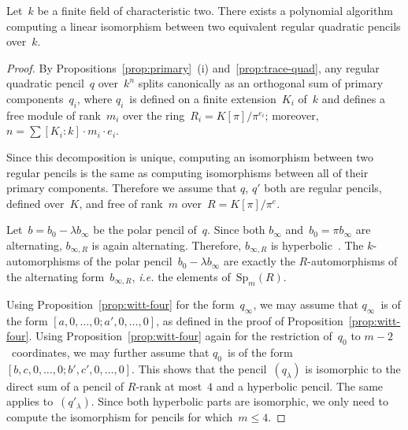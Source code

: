 \documentclass{amsart}
\begin{document}
\begin{prop}\label{prop:ip1s-bin-polynomial}
Let~$k$ be a finite field of characteristic two.
There exists a polynomial algorithm computing a linear isomorphism between
two equivalent regular quadratic pencils over~$k$.
\end{prop}
\begin{proof}
By Propositions~\ref{prop:primary}~(i) and~\ref{prop:trace-quad},
any regular quadratic pencil~$q$ over~$k^n$
splits canonically as an orthogonal sum of primary components~$q_i$,
where $q_i$~is defined on a finite extension~$K_i$ of~$k$
and defines a free module of rank~$m_i$ over the ring~$R_i = K[π]/π^{e_i}$;
moreover, $n = ∑ [K_i:k] · m_i · e_i$.

Since this decomposition is unique,
computing an isomorphism between two regular pencils is the same as
computing isomorphisms between all of their primary components.
Therefore we assume that $q$, $q'$ both are
regular pencils, defined over~$K$, and free of rank~$m$ over~$R=K[π]/π^e$.

Let~$b = b_0 - λ b_∞$ be the polar pencil of~$q$.
Since both $b_{∞}$ and~$b_{0} = π b_{∞}$ are alternating,
$b_{∞,R}$ is again alternating.
Therefore, $b_{∞, R}$ is hyperbolic~\cite[I.(3.5)]{milnorhusemoller}.
The $k$-automorphisms of the polar pencil~$b_0 - λ b_{∞}$
are exactly the $R$-automorphisms of the alternating form~$b_{∞,R}$,
\emph{i.e.} the elements of~$\mathrm{Sp}_{m} (R)$.

Using Proposition~\ref{prop:witt-four} for the form~$q_{∞}$,
we may assume that $q_{∞}$~is of the form $[a, 0, …, 0; a', 0, …, 0]$,
as defined in the proof of Proposition~\ref{prop:witt-four}.
Using Proposition~\ref{prop:witt-four} again for the restriction of~$q_{0}$
to $m-2$~coordinates, we may further assume that
$q_{0}$~is of the form~$[b, c, 0, …, 0; b', c', 0, …, 0]$.
This shows that the pencil~$(q_{λ})$ is isomorphic to
the direct sum of a pencil of $R$-rank at most~$4$
and a hyperbolic pencil.
The same applies to~$(q'_{λ})$.
Since both hyperbolic parts are isomorphic,
we only need to compute the isomorphism for pencils for which~$m ≤ 4$.

\bigskip


\end{proof}
\end{document}

